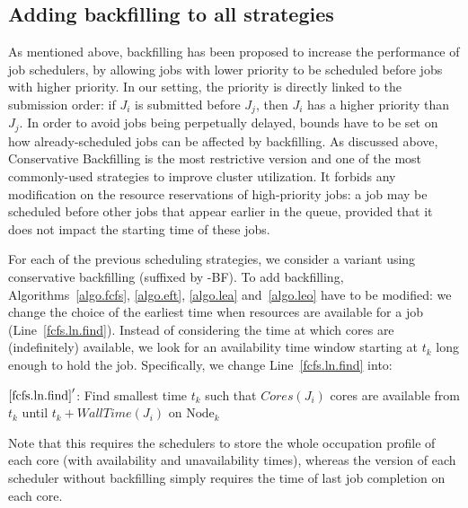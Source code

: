 \documentclass[conference,10pt]{IEEEtran}
\newcommand{\Node}[1]{\ensuremath{\mathrm{Node}_{#1}}\xspace}
\newcommand{\core}{\mathit{Cores}\xspace}
\newcommand{\walltime}{\mathit{WallTime}\xspace}
\begin{document}
\subsection{Adding backfilling to all strategies}

As mentioned above, backfilling has been proposed to increase the
performance of job schedulers, by allowing jobs with lower priority to be
scheduled before jobs with higher priority. In our setting, the
priority is directly linked to the submission order: if $J_i$ is
submitted before $J_j$, then $J_i$ has a higher priority than $J_j$.
In order to avoid jobs
being perpetually delayed, bounds have to be set on how already-scheduled
jobs can be affected by backfilling. As discussed above,
Conservative Backfilling is the most restrictive version and one of
the most commonly-used strategies to improve cluster utilization. It
forbids any modification on the resource
reservations of high-priority jobs: a job may be scheduled
before other jobs that appear earlier in the queue, provided that it
does not impact the starting time of these jobs.


For each of the previous scheduling strategies, we consider a variant
using conservative backfilling (suffixed by -BF).  To add
backfilling, Algorithms~\ref{algo.fcfs}, \ref{algo.eft},
\ref{algo.lea} and~\ref{algo.leo} have to be modified: we change the
choice of the earliest time when resources are available for a job
(Line~\ref{fcfs.ln.find}). Instead of considering the time at which
cores are (indefinitely) available, we look for an availability time
window starting at $t_k$ long enough to hold the
job. Specifically, we change Line~\ref{fcfs.ln.find} into:
\begin{algorithmic}[0]
  \State $\ref{fcfs.ln.find}'$: Find smallest time $t_k$ such that $\core(J_i)$ cores are
  available from $t_k$ until $t_k + \walltime(J_i)$ on $\Node{k}$
\end{algorithmic}

Note that this requires the schedulers to store  the whole occupation profile of
each core (with availability and unavailability times), whereas the
version of each scheduler without backfilling simply requires the time
of last job completion on each core.
\end{document}
